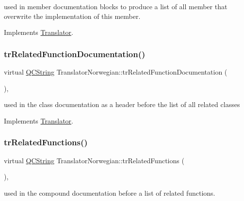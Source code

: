 used in member documentation blocks to produce a list of all member that overwrite the implementation of this member. 

Implements \mbox{\hyperlink{class_translator}{Translator}}.

\mbox{\label{class_translator_norwegian_a1d396db3adaa87cd7162d3997f4b0244}} 
\subsubsection{\texorpdfstring{trRelatedFunctionDocumentation()}{trRelatedFunctionDocumentation()}}
{\footnotesize\ttfamily virtual \mbox{\hyperlink{class_q_c_string}{Q\+C\+String}} Translator\+Norwegian\+::tr\+Related\+Function\+Documentation (\begin{DoxyParamCaption}{ }\end{DoxyParamCaption})\hspace{0.3cm}{\ttfamily [inline]}, {\ttfamily [virtual]}}

used in the class documentation as a header before the list of all related classes 

Implements \mbox{\hyperlink{class_translator}{Translator}}.

\mbox{\label{class_translator_norwegian_a2fce7ef1c3795aa2a3c6b6752feece19}} 
\subsubsection{\texorpdfstring{trRelatedFunctions()}{trRelatedFunctions()}}
{\footnotesize\ttfamily virtual \mbox{\hyperlink{class_q_c_string}{Q\+C\+String}} Translator\+Norwegian\+::tr\+Related\+Functions (\begin{DoxyParamCaption}{ }\end{DoxyParamCaption})\hspace{0.3cm}{\ttfamily [inline]}, {\ttfamily [virtual]}}

used in the compound documentation before a list of related functions. 

